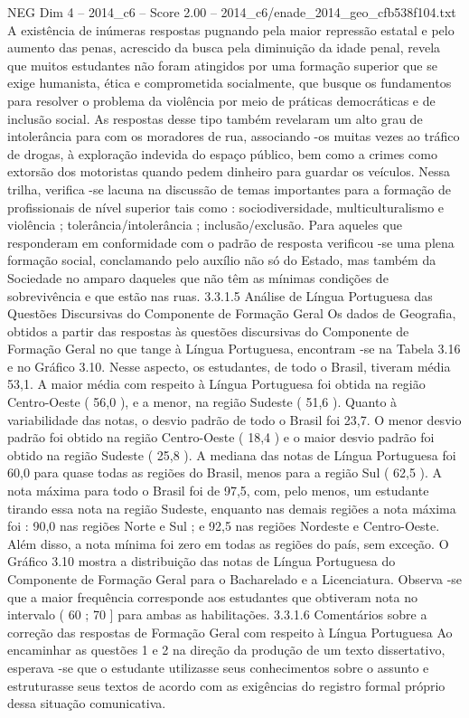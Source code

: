 \begin{textsample}{NEG Dim 4 – 2014\_c6 – Score 2.00 – 2014\_c6/enade\_2014\_geo\_cfb538f104.txt}
A existência de inúmeras respostas pugnando pela maior repressão estatal e pelo aumento das penas, acrescido da busca pela diminuição da idade penal, revela que muitos estudantes não foram atingidos por uma formação superior que se exige humanista, ética e comprometida socialmente, que busque os fundamentos para resolver o problema da violência por meio de práticas democráticas e de inclusão social.
As respostas desse tipo também revelaram um alto grau de intolerância para com os moradores de rua, associando -os muitas vezes ao tráfico de drogas, à exploração indevida do espaço público, bem como a crimes como extorsão dos motoristas quando pedem dinheiro para guardar os veículos.
Nessa trilha, verifica -se lacuna na discussão de temas importantes para a formação de profissionais de nível superior tais como : sociodiversidade, multiculturalismo e violência ; tolerância/intolerância ; inclusão/exclusão.
Para aqueles que responderam em conformidade com o padrão de resposta verificou -se uma plena formação social, conclamando pelo auxílio não só do Estado, mas também da Sociedade no amparo daqueles que não têm as mínimas condições de sobrevivência e que estão nas ruas. 3.3.1.5 Análise de Língua Portuguesa das Questões Discursivas do Componente de Formação Geral Os dados de Geografia, obtidos a partir das respostas às questões discursivas do Componente de Formação Geral no que tange à Língua Portuguesa, encontram -se na Tabela 3.16 e no Gráfico 3.10.
Nesse aspecto, os estudantes, de todo o Brasil, tiveram média 53,1.
A maior média com respeito à Língua Portuguesa foi obtida na região Centro-Oeste ( 56,0 ), e a menor, na região Sudeste ( 51,6 ).
Quanto à variabilidade das notas, o desvio padrão de todo o Brasil foi 23,7.
O menor desvio padrão foi obtido na região Centro-Oeste ( 18,4 ) e o maior desvio padrão foi obtido na região Sudeste ( 25,8 ).
A mediana das notas de Língua Portuguesa foi 60,0 para quase todas as regiões do Brasil, menos para a região Sul ( 62,5 ).
A nota máxima para todo o Brasil foi de 97,5, com, pelo menos, um estudante tirando essa nota na região Sudeste, enquanto nas demais regiões a nota máxima foi : 90,0 nas regiões Norte e Sul ; e 92,5 nas regiões Nordeste e Centro-Oeste.
Além disso, a nota mínima foi zero em todas as regiões do país, sem exceção.
O Gráfico 3.10 mostra a distribuição das notas de Língua Portuguesa do Componente de Formação Geral para o Bacharelado e a Licenciatura.
Observa -se que a maior frequência corresponde aos estudantes que obtiveram nota no intervalo ( 60 ; 70 ] para ambas as habilitações. 3.3.1.6 Comentários sobre a correção das respostas de Formação Geral com respeito à Língua Portuguesa Ao encaminhar as questões 1 e 2 na direção da produção de um texto dissertativo, esperava -se que o estudante utilizasse seus conhecimentos sobre o assunto e estruturasse seus textos de acordo com as exigências do registro formal próprio dessa situação comunicativa.

\end{textsample}
